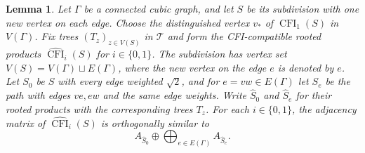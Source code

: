 \documentclass[10pt,a4paper]{article}
\theoremstyle{plain}
\newtheorem{lemma}[theorem]{Lemma}
\theoremstyle{definition}
\DeclareMathOperator{\CFI}{CFI}
\begin{document}
\begin{lemma}\label{lem:ss-cfi-blocks}
Let $\Gamma$ be a connected cubic graph, and let $S$ be its subdivision
with one new vertex on each edge.
Choose the distinguished vertex $v_*$ of $\CFI_1(S)$ in $V(\Gamma)$.
Fix trees $(T_z)_{z\in V(S)}$ in $\mathcal T$ and form the
CFI-compatible rooted products $\widehat{\CFI}_i(S)$ for $i\in\{0,1\}$.
The subdivision has vertex set $V(S)=V(\Gamma)\sqcup E(\Gamma)$,
where the new vertex on the edge $e$ is denoted by $e$.
Let $S_0$ be $S$ with every edge weighted $\sqrt2$, and for
$e=vw\in E(\Gamma)$ let $S_e$ be the path with edges $ve,ew$ and the
same edge weights.
Write $\widehat S_0$ and $\widehat S_e$ for their rooted products with
the corresponding trees $T_z$.
For each $i\in\{0,1\}$, the adjacency matrix of $\widehat{\CFI}_i(S)$
is orthogonally similar to
\begin{equation}\label{eq:ss-rooted-blocks}
 A_{\widehat S_0}\oplus\bigoplus_{e\in E(\Gamma)}A_{\widehat S_e}.
\end{equation}

\end{lemma}
\end{document}
